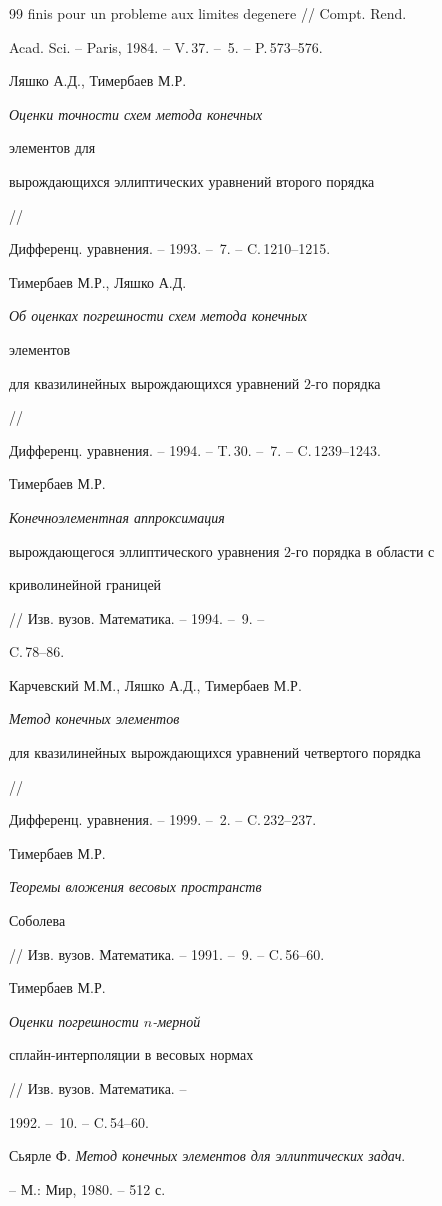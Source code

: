 \begin{thebibliography}{99}
{finis pour un probleme aux limites degenere} // Compt. Rend.


Acad. Sci. -- Paris, 1984. -- V.\,37. -- \No\,5. -- P.\,573--576.




Ляшко А.Д., Тимербаев М.Р. {\em Оценки точности схем метода конечных


элементов для


вырождающихся эллиптических уравнений второго порядка} //


Дифференц. уравнения. -- 1993. -- \No\,7. -- C.\,1210--1215.




Тимербаев М.Р., Ляшко А.Д. {\em Об оценках погрешности схем метода конечных


элементов


для квазилинейных вырождающихся уравнений $2$-го порядка} //


Дифференц. уравнения. -- 1994. -- T.\,30. -- \No\,7. -- C.\,1239--1243.




Тимербаев М.Р. {\em Конечноэлементная аппроксимация


вырождающегося эллиптического уравнения $2$-го порядка в области с


криволинейной границей} // Изв. вузов. Математика. -- 1994. -- \No\,9. --


C.\,78--86. 




Карчевский М.М., Ляшко А.Д., Тимербаев М.Р. {\em Метод конечных элементов 


для квазилинейных вырождающихся уравнений четвертого порядка} // 


Дифференц. уравнения. -- 1999. -- \No\,2. -- C.\,232--237.




Тимербаев М.Р. {\em Теоремы вложения весовых пространств


Соболева} // Изв. вузов. Математика. -- 1991. -- \No\,9. -- C.\,56--60. 




Тимербаев М.Р. {\em Оценки погрешности $n$-мерной


сплайн-интерполяции в весовых нормах} // Изв. вузов. Математика. --


1992. -- \No\,10. -- C.\,54--60.




Сьярле Ф. {\em Метод конечных элементов для эллиптических задач}.


-- М.: Мир, 1980. -- 512 с. 





\end{thebibliography}





\vskip 2cm












\label{end}





